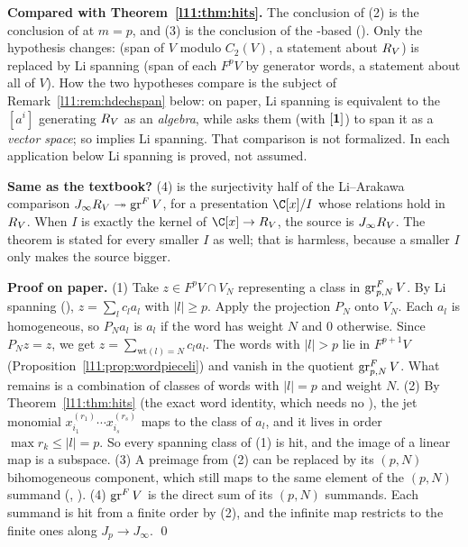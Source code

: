 \begin{dictionary}
\textbf{Compared with Theorem~\ref{l11:thm:hits}.} The conclusion of (2) is the conclusion of
\allowbreak{}\allowbreak{}\allowbreak{}\allowbreak{}\allowbreak{}
at $m=p$, and (3) is the conclusion of the -based
\allowbreak{}\allowbreak{}\allowbreak{}
(). Only the hypothesis changes:  (span of
$V$ modulo $C_2(V)$, a statement about $R_V$) is replaced by Li spanning (span of each $F^pV$ by generator words, a
statement about all of $V$). How the two hypotheses compare is the subject of Remark~\ref{l11:rem:hdechspan} below: on
paper, Li spanning is equivalent to the $[a^i]$ generating $R_V$ as an \emph{algebra}, while  asks
them (with $[\mathbf{1}]$) to span it as a \emph{vector space}; so  implies Li spanning. That comparison is
not formalized. In each application below Li spanning is proved, not assumed.

\textbf{Same as the textbook?} (4) is the surjectivity half of the Li--Arakawa comparison
$J_\infty R_V\twoheadrightarrow\operatorname{gr}^FV$, for a presentation $\C[x]/I$ whose relations hold in $R_V$. When
$I$ is exactly the kernel of $\C[x]\to\lelevenR$, the source is $J_\infty R_V$. The theorem is stated for every
smaller $I$ as well; that is harmless, because a smaller $I$ only makes the source bigger.
\end{dictionary}

\textbf{Proof on paper.} (1) Take $z\in F^pV\cap V_N$ representing a class in $\operatorname{gr}^F_{p,N}V$. By Li spanning (),
$z = \sum_lc_la_l$ with $|l|\ge p$. Apply the projection $P_N$ onto $V_N$. Each $a_l$ is homogeneous, so
$P_Na_l$ is $a_l$ if the word has weight $N$ and $0$ otherwise. Since $P_Nz = z$, we get
$z = \sum_{\mathrm{wt}(l)=N}c_la_l$. The words with $|l|>p$ lie in $F^{p+1}V$ (Proposition~\ref{l11:prop:wordpieceli}) and
vanish in the quotient $\operatorname{gr}^F_{p,N}V$. What remains is a combination of classes of words with $|l| = p$ and
weight $N$. (2) By Theorem~\ref{l11:thm:hits} (the exact word identity, which needs no ), the jet monomial
$x_{i_1}^{(r_1)}\cdots x_{i_s}^{(r_s)}$ maps to the class of $a_l$, and it lives in order $\max r_k\le|l| = p$. So every
spanning class of (1) is hit, and the image of a linear map is a subspace. (3) A preimage from (2) can be replaced by
its $(p,N)$ bihomogeneous component, which still maps to the same element of the $(p,N)$ summand
(\allowbreak{}\allowbreak{}\allowbreak{}\allowbreak{},
). (4) $\operatorname{gr}^FV$ is the direct sum of its $(p,N)$ summands. Each summand is hit from a
finite order by (2), and the infinite map restricts to the finite ones along $J_p\to J_\infty$. \qed

